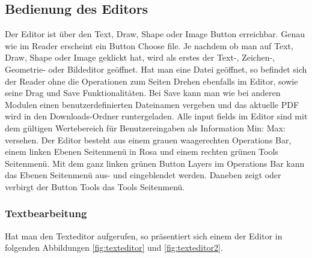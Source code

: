 \subsection{Bedienung des Editors}
Der Editor ist über den Text, Draw, Shape oder Image Button erreichbar. Genau wie im Reader erscheint ein Button Choose file. Je nachdem ob man auf Text, Draw, Shape oder Image geklickt hat, wird als erstes der Text-, Zeichen-, Geometrie- oder Bildeditor geöffnet. Hat man eine Datei geöffnet, so befindet sich der Reader ohne die Operationen zum Seiten Drehen ebenfalls im Editor, sowie seine Drag und Save Funktionalitäten. Bei Save kann man wie bei anderen Modulen einen benutzerdefinierten Dateinamen vergeben und das aktuelle PDF wird in den Downloads-Ordner runtergeladen. Alle input fields im Editor sind mit dem gültigen Wertebereich für Benutzereingaben als Information Min: Max: versehen. Der Editor besteht aus einem grauen waagerechten Operations Bar, einem linken Ebenen Seitenmenü in Rosa und einem rechten grünen Tools Seitenmenü. Mit dem ganz linken grünen Button Layers im Operations Bar kann das Ebenen Seitenmenü aus- und eingeblendet werden. Daneben zeigt oder verbirgt der Button Tools das Tools Seitenmenü. 

\subsubsection{Textbearbeitung}
Hat man den Texteditor aufgerufen, so präsentiert sich einem der Editor in folgenden Abbildungen \ref{fig:texteditor} und \ref{fig:texteditor2}.

